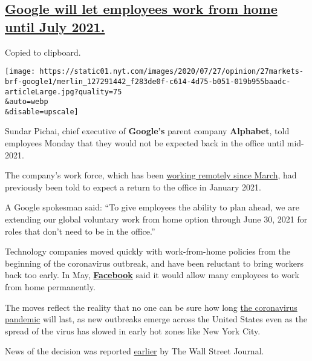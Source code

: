 \hypertarget{google-will-let-employees-work-from-home-until-july-2021}{%
\subsection{\texorpdfstring{\protect\hyperlink{google-will-let-employees-work-from-home-until-july-2021}{Google
will let employees work from home until July
2021.}}{Google will let employees work from home until July 2021.}}\label{google-will-let-employees-work-from-home-until-july-2021}}

Copied to clipboard.

\texttt{[image: https://static01.nyt.com/images/2020/07/27/opinion/27markets-brf-google1/merlin\_127291442\_f283de0f-c614-4d75-b051-019b955baadc-articleLarge.jpg?quality=75\\\&auto=webp\\\&disable=upscale]}

Sundar Pichai, chief executive of \textbf{Google's} parent company
\textbf{Alphabet}, told employees Monday that they would not be expected
back in the office until mid-2021.

The company's work force, which has been
\href{https://www.nytimes.com/2020/05/08/technology/coronavirus-work-from-home.html}{working
remotely since March}, had previously been told to expect a return to
the office in January 2021.

A Google spokesman said: ``To give employees the ability to plan ahead,
we are extending our global voluntary work from home option through June
30, 2021 for roles that don't need to be in the office.''

Technology companies moved quickly with work-from-home policies from the
beginning of the coronavirus outbreak, and have been reluctant to bring
workers back too early. In May,
\textbf{\href{https://www.nytimes.com/2020/05/21/business/coronavirus-stock-market-today.html}{Facebook}}
said it would allow many employees to work from home permanently.

The moves reflect the reality that no one can be sure how long
\href{https://www.nytimes.com/news-event/coronavirus?action=click\&pgtype=Article\&state=default\&module=STYLN_coronahub\&variant=show\&region=header\&context=menu}{the
coronavirus pandemic} will last, as new outbreaks emerge across the
United States even as the spread of the virus has slowed in early hot
zones like New York City.

News of the decision was reported
\href{https://www.wsj.com/articles/google-to-keep-employees-home-until-summer-2021-amid-coronavirus-pandemic-11595854201}{earlier}
by The Wall Street Journal.

